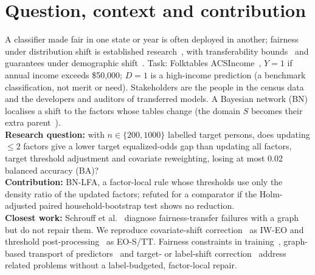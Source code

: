 \documentclass[11pt,a4paper]{article}
\begin{document}
\section{Question, context and contribution}
A classifier made fair in one state or year is often deployed in another; fairness under distribution shift is
established research~\cite{shao}, with transferability bounds~\cite{chen} and guarantees under demographic
shift~\cite{giguere}. Task: Folktables ACSIncome~\cite{ding}, $Y=1$ if annual income exceeds \$50{,}000;
$D=1$ is a high-income prediction (a benchmark classification, not merit or need). Stakeholders are the people in the
census data and the developers and auditors of transferred models. A Bayesian network (BN) localises a shift to the
factors whose tables change (the domain $S$ becomes their extra parent~\cite{pearl}).\\
\textbf{Research question:} with $n\in\{200,1000\}$ labelled target persons, does updating $\le2$ factors give a lower
target equalized-odds gap than updating all factors, target threshold adjustment and covariate reweighting, losing at
most 0.02 balanced accuracy (BA)?\\
\textbf{Contribution:} BN-LFA, a factor-local rule whose thresholds use only the density ratio of the updated factors;
refuted for a comparator if the Holm-adjusted paired household-bootstrap test shows no reduction.\\
\textbf{Closest work:} Schrouff et al.~\cite{schrouff} diagnose fairness-transfer failures with a graph but do not
repair them. We reproduce covariate-shift correction~\cite{shimodaira,singh,rezaei} as IW-EO and threshold
post-processing~\cite{hardt} as EO-S/TT. Fairness constraints in training~\cite{agarwal}, graph-based transport of
predictors~\cite{subbaswamy,magliacane} and target- or label-shift correction~\cite{zhang,lipton} address related
problems without a label-budgeted, factor-local repair.
\end{document}
